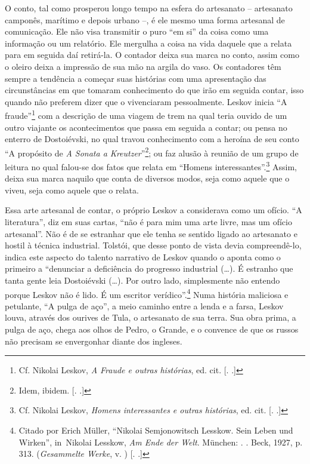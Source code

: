 O conto, tal como prosperou longo tempo na esfera do artesanato --
artesanato camponês, marítimo e depois urbano --, é ele mesmo uma forma
artesanal de comunicação. Ele não visa transmitir o puro ``em si'' da
coisa como uma informação ou um relatório. Ele mergulha a coisa na vida
daquele que a relata para em seguida daí retirá-la. O contador deixa sua
marca no conto, assim como o oleiro deixa a impressão de sua mão na
argila do vaso. \label{supra}Os contadores têm sempre a tendência a começar suas
histórias com uma apresentação das circunstâncias em que tomaram
conhecimento do que irão em seguida contar, isso quando não preferem
dizer que o vivenciaram pessoalmente. Leskov inicia ``A
fraude''\footnote{Cf. Nikolai Leskov, \emph{A Fraude e outras
  histórias}, ed. cit. [. .]} com a descrição de uma viagem de
trem na qual teria ouvido de um outro viajante os acontecimentos que
passa em seguida a contar; ou pensa no enterro de Dostoiévski, no qual
travou conhecimento com a heroína de seu conto ``A propósito de \emph{A
Sonata a Kreutzer}''\footnote{Idem, ibidem. [. .]}; ou faz
alusão à reunião de um grupo de leitura no qual falou-se dos fatos que
relata em ``Homens interessantes''.\footnote{Cf. Nikolai Leskov,
  \emph{Homens interessantes e outras histórias}, ed. cit. [. 
  .]} Assim, deixa sua marca naquilo que conta de diversos modos,
seja como aquele que o viveu, seja como aquele que o relata.

Essa arte artesanal de contar, o próprio Leskov a considerava como um
ofício. ``A literatura'', diz em suas cartas, ``não é para mim uma arte
livre, mas um ofício artesanal''. Não é de se estranhar que ele tenha se
sentido ligado ao artesanato e hostil à técnica industrial. Tolstói, que
desse ponto de vista devia compreendê-lo, indica este aspecto do talento
narrativo de Leskov quando o aponta como o primeiro a ``denunciar a
deficiência do progresso industrial (\ldots{}). É estranho que tanta gente
leia Dostoiévski (\ldots{}). Por outro lado, simplesmente não entendo porque
Leskov não é lido. É um escritor verídico''.\footnote{Citado por Erich
  Müller, ``Nikolai Semjonowitsch Lesskow. Sein Leben und Wirken'',
  in~Nikolai Lesskow, \emph{Am Ende der Welt}. München: . . Beck, 1927,
  p. 313. (\emph{Gesammelte Werke}, v. ) [. .]} Numa
história maliciosa e petulante, ``A pulga de aço'', a meio caminho entre
a lenda e a farsa, Leskov louva, através dos ourives de Tula, o
artesanato de sua terra. Sua obra prima, a pulga de aço, chega aos olhos
de Pedro, o Grande, e o convence de que os russos não precisam se
envergonhar diante dos ingleses.

